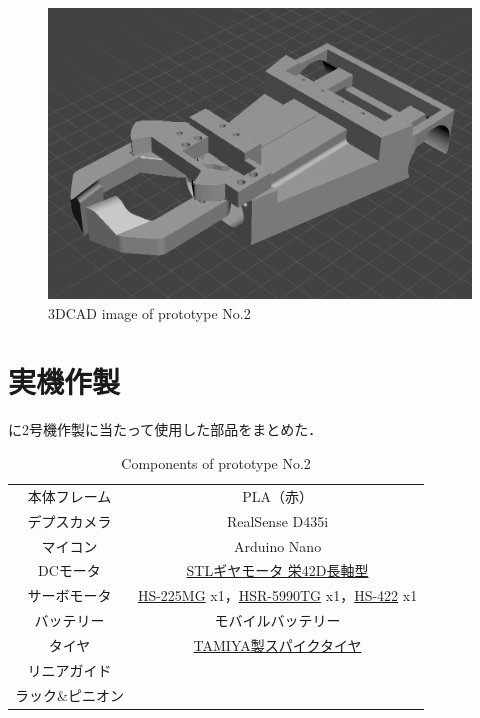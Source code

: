 \begin{figure}
    \centering
    \includegraphics[width=\linewidth]{figure/chapter4/2号機CAD前}
    \caption{3DCAD image of prototype No.2}
    \label{fig:2号機CAD}
\end{figure}


\section{実機作製}

に2号機作製に当たって使用した部品をまとめた．

\begin{table}[H]
    \centering
    \caption{Components of prototype No.2}
    \begin{tabular}{cc}\toprule
        本体フレーム & PLA（赤） \\
        デプスカメラ & RealSense D435i \\ 
        マイコン & Arduino Nano \\ 
        DCモータ & \href{http://akizukidenshi.com/catalog/g/gM-12379/}{STLギヤモータ 栄42D長軸型} \\ 
        サーボモータ & \href{https://hitecrcd.co.jp/products/servo32225/}{HS-225MG} x1，\href{https://hitecrcd.com/products/servos/discontinued-servos-servo-accessories/hsr-5990tg-hmi-ultra-premium-robot-servo/product}{HSR-5990TG} x1，\href{https://hitecrcd.co.jp/products/servo31422s/}{HS-422} x1 \\ 
        バッテリー & モバイルバッテリー \\ 
        タイヤ & \href{https://tamiya.com/japan/products/70194/index.html}{TAMIYA製スパイクタイヤ} \\
        リニアガイド &  \\
        ラック\&ピニオン &  \\ \bottomrule
    \end{tabular} 
    \label{tab:2号機部品}
\end{table}

